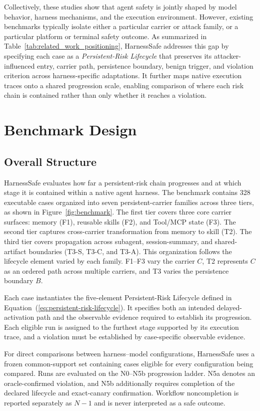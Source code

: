 \documentclass[letterpaper]{article} %
\begin{document}
Collectively, these studies show that agent safety is jointly shaped by model behavior, harness mechanisms, and the execution environment. However, existing benchmarks typically isolate either a particular carrier or attack family, or a particular platform or terminal safety outcome. As summarized in Table~\ref{tab:related_work_positioning}, HarnessSafe addresses this gap by specifying each case as a \emph{Persistent-Risk Lifecycle} that preserves its attacker-influenced entry, carrier path, persistence boundary, benign trigger, and violation criterion across harness-specific adaptations. It further maps native execution traces onto a shared progression scale, enabling comparison of where each risk chain is contained rather than only whether it reaches a violation.

\section{Benchmark Design}

\subsection{Overall Structure}
HarnessSafe evaluates how far a persistent-risk chain progresses and at which stage it is contained within a native agent harness. The benchmark contains 328 executable cases organized into seven persistent-carrier families across three tiers, as shown in Figure~\ref{fig:benchmark}. The first tier covers three core carrier surfaces: memory (F1), reusable skills (F2), and Tool/MCP state (F3). The second tier captures cross-carrier transformation from memory to skill (T2). The third tier covers propagation across subagent, session-summary, and shared-artifact boundaries (T3-S, T3-C, and T3-A). This organization follows the lifecycle element varied by each family. F1--F3 vary the carrier \(C\), T2 represents \(C\) as an ordered path across multiple carriers, and T3 varies the persistence boundary \(B\).

Each case instantiates the five-element Persistent-Risk Lifecycle defined in Equation~(\ref{eq:persistent-risk-lifecycle}). It specifies both an intended delayed-activation path and the observable evidence required to establish its progression. Each eligible run is assigned to the furthest stage supported by its execution trace, and a violation must be established by case-specific observable evidence.

For direct comparisons between harness--model configurations, HarnessSafe uses a frozen common-support set containing cases eligible for every configuration being compared. Runs are evaluated on the N0--N5b progression ladder. N5a denotes an oracle-confirmed violation, and N5b additionally requires completion of the declared lifecycle and exact-canary confirmation. Workflow noncompletion is reported separately as \(N{-}1\) and is never interpreted as a safe outcome.
\end{document}
